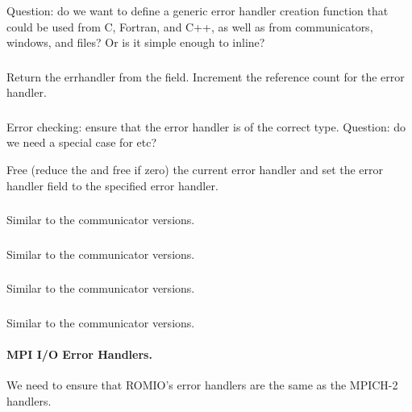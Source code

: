 \documentclass{article}
\begin{document}
Question: do we want to define a generic error handler
creation function that could be used from C, Fortran, and C++, as well as from
communicators, windows, and files?  Or is it simple enough to inline?

\subsubsection{}
Return the errhandler from the  field.  Increment the 
reference count for the error handler.

\subsubsection{}
Error checking: ensure that the error handler is of the correct type.  
Question: do we need a special case for  etc?

Free (reduce the  and free if zero) the current error handler
and set the error handler field to the specified error handler.

\subsubsection{}
Similar to the communicator versions.

\subsubsection{}
Similar to the communicator versions.

\subsubsection{}
Similar to the communicator versions.

\subsubsection{}
Similar to the communicator versions.

\paragraph{MPI I/O Error Handlers.}
We need to ensure that ROMIO's error handlers are the same as the MPICH-2
handlers.
\end{document}

